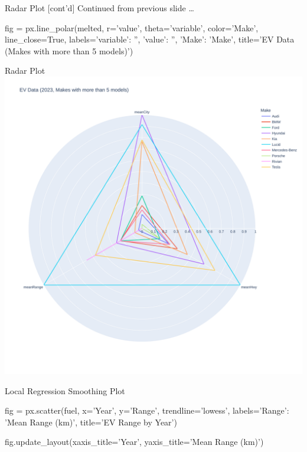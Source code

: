 \documentclass[ignorenonframetext,xcolor=x11names]{beamer}
\begin{document}
\begin{frame}[fragile]{Radar Plot \small [cont'd]}
Continued from previous slide \ldots
\footnotesize
\begin{pythoncode}
fig = px.line_polar(melted, 
     r='value', 
     theta='variable', 
     color='Make', 
     line_close=True,
     labels={'variable': '', 
             'value': '', 
             'Make': 'Make'},
     title='EV Data (Makes with more than 5 models)')
\end{pythoncode}
\end{frame}

\begin{frame}{Radar Plot}
\centering
  \includegraphics[width=.8\textwidth]{px.fuel.radar.pdf}
\end{frame}



\begin{frame}[fragile]{Local Regression Smoothing Plot}
\footnotesize
\begin{pythoncode}
fig = px.scatter(fuel, 
    x='Year', y='Range', trendline='lowess',
    labels={'Range': 'Mean Range (km)'},
    title='EV Range by Year')

fig.update_layout(xaxis_title='Year',
                  yaxis_title='Mean Range (km)')
\end{pythoncode}
\end{frame}
\end{document}
